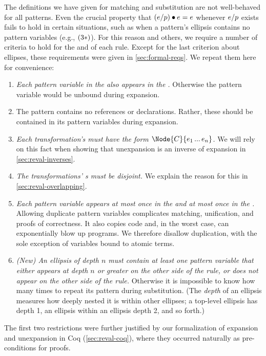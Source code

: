 The definitions we have given for matching and substitution are not
well-behaved for all patterns. Even the crucial property that
$(e / p) \bullet e = e$ whenever $e / p$ exists fails to hold in certain
situations, such as when a pattern's ellipsis contains no pattern variables (e.g.,
$(3*)$). For this reason and others, we require a number of criteria
to hold for the  and  of each rule. Except for the
last criterion about ellipses, these requirements were given in
\cref{sec:formal-reqs}. We repeat them here for convenience:
\begin{enumerate}
\item \emph{Each pattern variable in the  also appears in the
  .} Otherwise the pattern variable would be unbound during
  expansion.
\item The  pattern contains no references or declarations. Rather, these
  should be contained in its pattern variables during expansion.
\item \emph{Each transformation's  must have the form
  $\Node{C}{e_1 \dd e_n}$.} We will rely on this fact when showing that
  unexpansion is an inverse of expansion in \cref{sec:reval-inverses}.
\item \emph{The transformations' s must be disjoint.} We
  explain the reason for this in \cref{sec:reval-overlapping}.
\item \emph{Each pattern variable appears at most once in the  and at
  most once in the .}
  Allowing duplicate pattern variables complicates matching, unification,
  and proofs of correctness. It also copies code
  and, in the worst case, can exponentially blow up programs.
  We therefore disallow duplication,
  with the sole exception of variables bound to atomic terms.
\item \emph{(New) An ellipsis of depth $n$ must contain at least one pattern variable
  that either appears at depth $n$ or greater on the other side of the
  rule, or does not appear on the other side of the rule.} Otherwise it is
  impossible to know how many times to repeat its pattern during
  substitution. (The \emph{depth} of an ellipsis measures how deeply nested
  it is within other ellipses; a top-level ellipsis has depth 1, an
  ellipsis within an ellipsis depth 2, and so forth.)
\end{enumerate}
The first two restrictions were further justified by our formalization of
expansion and unexpansion in Coq (\cref{sec:reval-coq}), 
where they occurred naturally as pre-conditions
for proofs.

